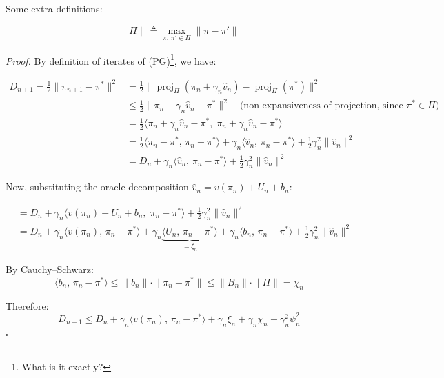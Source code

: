 \documentclass[a4paper,oneside,11pt]{report}
\begin{document}
Some extra definitions:

\[
  \| \Pi \| \triangleq \max_{\pi,\, \pi' \in \Pi} \| \pi - \pi' \|
\]


\textit{Proof.} By definition of iterates of (PG)\footnote{What is it exactly?}, we have:

\begin{align*}
  D_{n+1} = \frac{1}{2}\|\pi_{n+1} - \pi^*\|^2
  &= \frac{1}{2}\|\operatorname{proj}_\Pi(\pi_n + \gamma_n \hat{v}_n) - \operatorname{proj}_\Pi(\pi^*)\|^2 \\
  &\leq \frac{1}{2}\|\pi_n + \gamma_n \hat{v}_n - \pi^*\|^2
    \quad \text{(non-expansiveness of projection, since $\pi^* \in \Pi$)} \\
  &= \frac{1}{2}\langle \pi_n + \gamma_n \hat{v}_n - \pi^*,\; \pi_n + \gamma_n \hat{v}_n - \pi^* \rangle \\
  &= \frac{1}{2}\langle \pi_n - \pi^*,\, \pi_n - \pi^* \rangle
    + \gamma_n \langle \hat{v}_n,\, \pi_n - \pi^* \rangle
    + \frac{1}{2}\gamma_n^2 \|\hat{v}_n\|^2 \\
  &= D_n + \gamma_n \langle \hat{v}_n,\, \pi_n - \pi^* \rangle + \frac{1}{2}\gamma_n^2 \|\hat{v}_n\|^2
\end{align*}

Now, substituting the oracle decomposition $\hat{v}_n = v(\pi_n) + U_n + b_n$:

\begin{align*}
  &= D_n + \gamma_n \langle v(\pi_n) + U_n + b_n,\; \pi_n - \pi^* \rangle + \frac{1}{2}\gamma_n^2 \|\hat{v}_n\|^2 \\
  &= D_n + \gamma_n \langle v(\pi_n),\, \pi_n - \pi^* \rangle
    + \gamma_n \underbrace{\langle U_n,\, \pi_n - \pi^* \rangle}_{= \xi_n}
    + \gamma_n \langle b_n,\, \pi_n - \pi^* \rangle
    + \frac{1}{2}\gamma_n^2 \|\hat{v}_n\|^2
\end{align*}

By Cauchy--Schwarz:
\[
  \langle b_n,\, \pi_n - \pi^* \rangle
  \leq \|b_n\| \cdot \|\pi_n - \pi^*\|
  \leq \|B_n\| \cdot \|\Pi\|
  = \chi_n
\]

Therefore:
\[
  \boxed{D_{n+1} \leq D_n + \gamma_n \langle v(\pi_n),\, \pi_n - \pi^* \rangle + \gamma_n \xi_n + \gamma_n \chi_n + \gamma_n^2 \psi_n^2}
\]
\hfill $\square$
\end{document}
